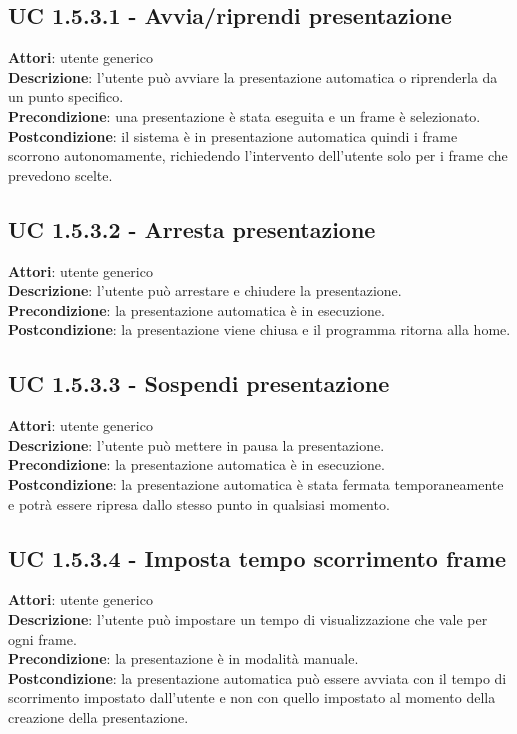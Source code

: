 	\subsection{UC 1.5.3.1 - Avvia/riprendi presentazione}{
		\label{uc1.5.3.1}
		\textbf{Attori}: utente generico \\
		\textbf{Descrizione}: l'utente può avviare la presentazione automatica o riprenderla da un punto specifico. \\
		\textbf{Precondizione}: una presentazione è stata eseguita e un frame è selezionato.	\\
		\textbf{Postcondizione}: il sistema è in presentazione automatica quindi i frame scorrono autonomamente, richiedendo l'intervento dell'utente solo per i frame che prevedono scelte.	\\
	}
	\subsection{UC 1.5.3.2 - Arresta presentazione}{
		\label{uc1.5.3.2}
		\textbf{Attori}: utente generico \\
		\textbf{Descrizione}: l'utente può arrestare e chiudere la presentazione. \\
		\textbf{Precondizione}: la presentazione automatica è in esecuzione.	\\
		\textbf{Postcondizione}: la presentazione viene chiusa e il programma ritorna alla home.	\\
	}
	\subsection{UC 1.5.3.3 - Sospendi presentazione}{
		\label{uc1.5.3.3}
		\textbf{Attori}: utente generico \\
		\textbf{Descrizione}: l'utente può mettere in pausa la presentazione. \\
		\textbf{Precondizione}: la presentazione automatica è in esecuzione.	\\
		\textbf{Postcondizione}: la presentazione automatica è stata fermata temporaneamente e potrà essere ripresa dallo stesso punto in qualsiasi momento.	\\
	}
	\subsection{UC 1.5.3.4 - Imposta tempo scorrimento frame}{
		\label{uc1.5.3.4}
		\textbf{Attori}: utente generico \\
		\textbf{Descrizione}: l'utente può impostare un tempo di visualizzazione che vale per ogni frame. \\
		\textbf{Precondizione}: la presentazione è in modalità manuale.	\\
		\textbf{Postcondizione}: la presentazione automatica può essere avviata con il tempo di scorrimento impostato dall'utente e non con quello impostato al momento della creazione della presentazione.	\\
	}
